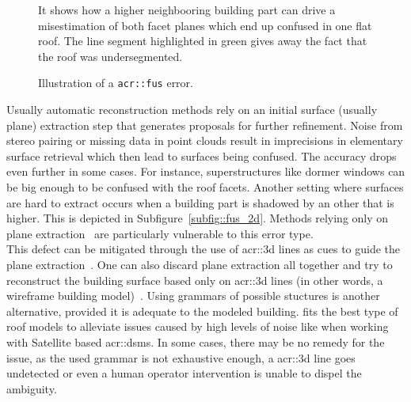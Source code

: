 \begin{figure}[htbp]
{\begin{subfloatrow}
{{                                        It shows how a higher neighbooring building part can drive a misestimation of both facet planes which end up confused in one flat roof.
                                        The line segment highlighted in green gives away the fact that the roof was undersegmented.
                                    }
                                }
                        \end{subfloatrow}
                    }{
                        \caption{
                            \label{fig::fus}
                            Illustration of a \texttt{\gls{acr::fus}} error.
                        }
                    }
                \end{figure}

                Usually automatic reconstruction methods rely on an initial surface (usually plane) extraction step that generates proposals for further refinement.
                Noise from stereo pairing or missing data in point clouds result in imprecisions in elementary surface retrieval which then lead to surfaces being confused.
                The accuracy drops even further in some cases.
                For instance, superstructures like dormer windows can be big enough to be confused with the roof facets.
                Another setting where surfaces are hard to extract occurs when a building part is shadowed by an other that is higher.
                This is depicted in Subfigure~\ref{subfig::fus_2d}.
                Methods relying only on plane extraction~\parencite{taillandier2004automatic,durupt2006automatic,nan2017polyfit} are particularly vulnerable to this error type.\\

                This defect can be mitigated through the use of \gls{acr::3d} lines as cues to guide the plane extraction~\parencite{zebedin2008fusion,sinha2009piecewise}.
                One can also discard plane extraction all together and try to reconstruct the building surface based only on \gls{acr::3d} lines (in other words, a wireframe building model)~\parencite{hofer2017efficient,langlois2019surface}.
                Using grammars of possible stuctures is another alternative, provided it is adequate to the modeled building.
                \textcite{lafarge2008structural} fits the best type of roof models to alleviate issues caused by high levels of noise like when working with Satellite based \glspl{acr::dsm}.
                In some cases, there may be no remedy for the issue, as the used grammar is not exhaustive enough, a \gls{acr::3d} line goes undetected or even a human operator intervention is unable to dispel the ambiguity.


